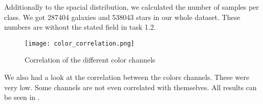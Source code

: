 Additionally to the spacial distribution, we calculated the number of samples per class. We got 287404 galaxies and  538043 stars in our whole dataset. These numbers are without the stated field in task 1.2.

\begin{figure}
    \texttt{[image: color\_correlation.png]}
    \caption[short]{Correlation of the different color channels}
    \label{colorCorr}
\end{figure}
We also had a look at the correlation between the colors channels. These were very low. Some channels are not even correlated with themselves. All results can be seen in .

